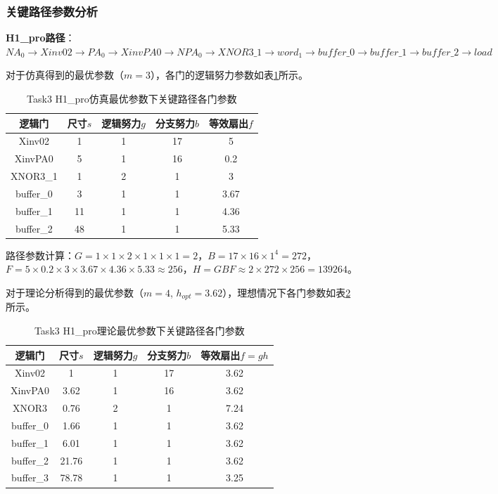 \documentclass[UTF8,12pt,a4paper]{ctexart}
\begin{document}
\subsubsection{关键路径参数分析}

\textbf{H1\_pro路径}：$NA_0 \rightarrow Xinv02 \rightarrow PA_0 \rightarrow XinvPA0 \rightarrow NPA_0 \rightarrow XNOR3\_1 \rightarrow word_1 \rightarrow buffer\_0 \rightarrow buffer\_1 \rightarrow buffer\_2 \rightarrow load$

对于仿真得到的最优参数（$m=3$），各门的逻辑努力参数如表\ref{tab:task3_h1pro_sim_params}所示。

\begin{table}[htbp]
\centering
\caption{Task3 H1\_pro仿真最优参数下关键路径各门参数}
\label{tab:task3_h1pro_sim_params}
\begin{tabular}{ccccc}
\toprule
逻辑门 & 尺寸$s$ & 逻辑努力$g$ & 分支努力$b$ & 等效扇出$f$ \\
\midrule
Xinv02 & 1 & 1 & 17 & 5 \\
XinvPA0 & 5 & 1 & 16 & 0.2 \\
XNOR3\_1 & 1 & 2 & 1 & 3 \\
buffer\_0 & 3 & 1 & 1 & 3.67 \\
buffer\_1 & 11 & 1 & 1 & 4.36 \\
buffer\_2 & 48 & 1 & 1 & 5.33 \\
\bottomrule
\end{tabular}
\end{table}

路径参数计算：$G = 1 \times 1 \times 2 \times 1 \times 1 \times 1 = 2$，$B = 17 \times 16 \times 1^4 = 272$，$F = 5 \times 0.2 \times 3 \times 3.67 \times 4.36 \times 5.33 \approx 256$，$H = GBF \approx 2 \times 272 \times 256 = 139264$。

对于理论分析得到的最优参数（$m=4$, $h_{opt}=3.62$），理想情况下各门参数如表\ref{tab:task3_h1pro_theo_params}所示。

\begin{table}[htbp]
\centering
\caption{Task3 H1\_pro理论最优参数下关键路径各门参数}
\label{tab:task3_h1pro_theo_params}
\begin{tabular}{ccccc}
\toprule
逻辑门 & 尺寸$s$ & 逻辑努力$g$ & 分支努力$b$ & 等效扇出$f=gh$ \\
\midrule
Xinv02 & 1 & 1 & 17 & 3.62 \\
XinvPA0 & 3.62 & 1 & 16 & 3.62 \\
XNOR3 & 0.76 & 2 & 1 & 7.24 \\
buffer\_0 & 1.66 & 1 & 1 & 3.62 \\
buffer\_1 & 6.01 & 1 & 1 & 3.62 \\
buffer\_2 & 21.76 & 1 & 1 & 3.62 \\
buffer\_3 & 78.78 & 1 & 1 & 3.25 \\
\bottomrule
\end{tabular}
\end{table}
\end{document}

